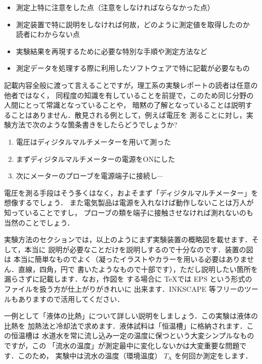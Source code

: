 \documentclass[a4paper, 10pt]{jarticle}
\def\rm#1{\mathrm{#1}}
\begin{document}
\begin{itemize}
  \setlength{\itemsep}{-2mm}
   \item 測定上特に注意をした点（注意をしなければならなかった点）
   \item 測定装置で特に説明をしなければ何故，どのように測定値を取得したのか
       読者にわからない点
   \item 実験結果を再現するために必要な特別な手順や測定方法など
   \item 測定データを処理する際に利用したソフトウェアで特に記載が必要なもの
  \end{itemize}

  記載内容全般に渡って言えることですが，理工系の実験レポートの読者は任意の他者ではなく，
  同程度の知識を有していることを前提で，このため同じ分野の人間にとって常識となっていることや，
  暗黙の了解となっていることは説明することはありません．散見される例として，例えば電圧を
  測ることに対し，実験方法で次のような箇条書きをしたらどうでしょうか?
  \begin{enumerate}
  \setlength{\itemsep}{-2mm}
   \item 電圧はディジタルマルチメーターを用いて測った
   \item まずディジタルマルチメーターの電源をONにした
   \item 次にメーターのプローブを電源端子に接続し$\cdots$
  \end{enumerate}
  
  電圧を測る手段はそう多くはなく，およそまず「ディジタルマルチメーター」を想像するでしょう．
  また電気製品は電源を入れなけば動作しないことは万人が知っていることですし，
  プローブの類を端子に接触させなければ測れないのも当然のことでしょう．
  
  実験方法のセクションでは，以上のようにまず実験装置の概略図を載せます．そして，本当に
  説明が必要なことだけを説明しするので十分なのです．装置の図は
  本当に簡単なものでよく（凝ったイラストやカラーを用いる必要はありません．直線，四角，円で
  書いたようなもので十部です），ただし説明したい箇所を漏らさずに記載します．なお，作図を
  する場合に \TeX では EPS という形式のファイルを扱う方が仕上がりがきれいに
  出来ます．INKSCAPE 等フリーのツールもありますので活用してください．

  \vspace{3mm}
  一例として「液体の比熱」について詳しい説明をしましょう．この実験は液体の比熱を
  加熱法と冷却法で求めます．液体試料は「恒温槽」に格納されます．この恒温槽は
  水道水を常に流し込み一定の温度に保つという大変シンプルなものですが，この
  「流水の温度」が測定最中に変化しないかは大変重要な問題です．このため，
  実験中は流水の温度（環境温度） $T_\rm{A}$ を何回か測定をします．
  
\end{document}
